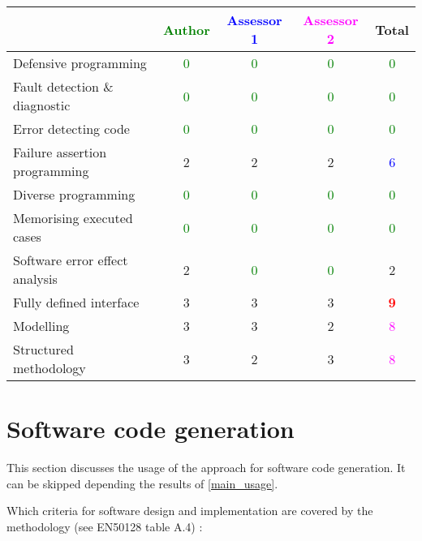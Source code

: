 \begin{tabular}{|l | c | c | c | c|}
\hline
& \textcolor{green}{Author} & \textcolor{blue}{Assessor 1} & \textcolor{magenta}{Assessor 2} & Total \\
\hline
Defensive programming & \textcolor{green}{0} & \textcolor{green}{0} & \textcolor{green}{0} & \textcolor{green}{0} \\
\hline
Fault detection \& diagnostic & \textcolor{green}{0} & \textcolor{green}{0} & \textcolor{green}{0} & \textcolor{green}{0} \\
\hline
Error detecting code & \textcolor{green}{0} & \textcolor{green}{0} & \textcolor{green}{0} & \textcolor{green}{0} \\
\hline
Failure assertion programming & 2     & 2     & 2     & \textcolor{blue}{6} \\
\hline
Diverse programming & \textcolor{green}{0} & \textcolor{green}{0} & \textcolor{green}{0} & \textcolor{green}{0} \\
\hline
Memorising executed cases & \textcolor{green}{0} & \textcolor{green}{0} & \textcolor{green}{0} & \textcolor{green}{0} \\
\hline
Software error effect analysis & 2     & \textcolor{green}{0} & \textcolor{green}{0} & 2     \\
\hline
Fully defined interface & 3     & 3     & 3     & \textcolor{red}{\textbf{9}} \\
\hline
Modelling & 3     & 3     & 2     & \textcolor{magenta}{8} \\
\hline
Structured methodology & 3     & 2     & 3     & \textcolor{magenta}{8} \\
\hline
\end{tabular}

\section{Software code generation}
This section discusses the usage of the approach for software code generation.
It can be skipped depending the results of \ref{main_usage}.

Which criteria for software design and implementation are covered by the methodology
(see EN50128 table A.4) :

